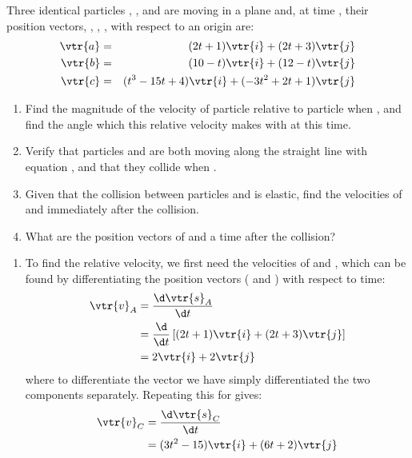 
\begin{problem}[A1988FMIVQ1a] %
{Three identical particles , , and  are moving in a plane and, at time , their position vectors, , , , with respect to an origin  are:
\begin{eqnarray*}
\vtr{a} &=& (2t +1)\vtr{i} + (2t+ 3)\vtr{j} \\
\vtr{b} &=& (10 - t)\vtr{i} + (12 - t)\vtr{j} \\ 
\vtr{c} &=& (t^{3} - 15t + 4)\vtr{i} + (-3t^{2} + 2t + 1)\vtr{j} 
\end{eqnarray*} 

\begin{enumerate}
	\item Find the magnitude of the velocity of particle  relative to particle  when , and find the angle which this relative velocity makes with  at this time.
	\item Verify that particles  and  are both moving along the straight line with equation , and that they collide when .
	\item Given that the collision between particles  and  is elastic, find the velocities of  and  immediately after the collision.
	\item What are the position vectors of  and  a time \vari{\tau} after the collision?
\end{enumerate}
}
{}
{
\begin{enumerate}
	\item To find the relative velocity, we first need the velocities of  and , which can be found by differentiating the position vectors ( and ) with respect to time:
\begin{eqnarray*} 
\vtr{v}_{A} &= \frac{\d \vtr{s}_{A}}{\d t} \\ 
&= \frac{\d}{\d t}\left[(2t + 1)\vtr{i} + (2t + 3)\vtr{j}\right] \\ 
&= 2\vtr{i} + 2\vtr{j} 
\end{eqnarray*}
where to differentiate the vector we have simply differentiated the two components separately. Repeating this for   gives:
\begin{eqnarray*} 
\vtr{v}_{C} & = \frac{\d \vtr{s}_{C}}{\d t} \\ 
&= (3t^{2} - 15)\vtr{i} + (6t + 2)\vtr{j} 
\end{eqnarray*}


\end{enumerate}}
\end{problem}
